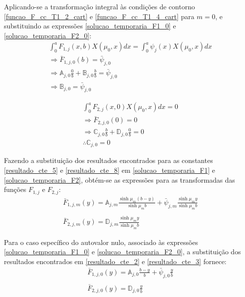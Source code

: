 Aplicando-se a transformação integral às condições de contorno \eqref{funcao_F_cc_T1_2_cart} e \eqref{funcao_F_cc_T1_4_cart} para $m = 0$, e substituindo as expressões \eqref{solucao_temporaria_F1_0} e \eqref{solucao_temporaria_F2_0}:
\begin{align}
	& \int_0^a F_{1,j}(x, b)X(\mu_0, x)dx = \int_0^a \psi_j(x)X(\mu_0, x)dx \nonumber \\
	& \Rightarrow \bar{F}_{1,j,0}(b) = \bar{\psi}_{j,0} \nonumber \\
	& \Rightarrow \mathbb{A}_{j,0}\frac{0}{b} + \mathbb{B}_{j,0}\frac{b}{b} = \bar{\psi}_{j,0} \nonumber \\
	& \Rightarrow \mathbb{B}_{j,0} = \bar{\psi}_{j,0} \label{resultado_cte_2}
\end{align} 

\begin{align}
	& \int_0^a F_{2,j}(x, 0)X(\mu_0, x)dx = 0 \nonumber \\
	& \Rightarrow \bar{F}_{2,j,0}(0) = 0 \nonumber \\
	& \Rightarrow \mathbb{C}_{j,0}\frac{b}{b} + \mathbb{D}_{j,0}\frac{0}{b} = 0 \nonumber \\
	& \therefore \mathbb{C}_{j,0} = 0 \label{resultado_cte_3}
\end{align}

Fazendo a substituição dos resultados encontrados para as constantes \eqref{resultado_cte_5} e \eqref{resultado_cte_8}
em \eqref{solucao_temporaria_F1} e \eqref{solucao_temporaria_F2}, obtém-se as expressões para as transformadas das funções $F_{1,j}$ e $F_{2,j}$:
\begin{align}
& \bar{F}_{1,j,m}(y) = \mathbb{A}_{j,m}\frac{\sinh\mu_m (b - y)}{\sinh\mu_m b} + \bar{\psi}_{j, m}\frac{\sinh\mu_m y}{\sinh\mu_m b} \label{math_A_1} \\ \nonumber \\
& \bar{F}_{2,j,m}(y) = \mathbb{D}_{j,m}\frac{\sinh\mu_m y}{\sinh\mu_m b} \label{math_A_2}
\end{align} 

Para o caso específico do autovalor nulo, associado às expressões \eqref{solucao_temporaria_F1_0} e \eqref{solucao_temporaria_F2_0}, a substituição dos
resultados encontrados em \eqref{resultado_cte_2} e \eqref{resultado_cte_3} fornece:
\begin{align}
& \bar{F}_{1,j,0}(y) = \mathbb{A}_{j,0}\frac{b - y}{b} + \bar{\psi}_{j,0}\frac{y}{b} \label{math_A_3} \\ \nonumber \\
& \bar{F}_{2,j,0}(y) = \mathbb{D}_{j,0}\frac{y}{b} \label{math_A_4}
\end{align} 


